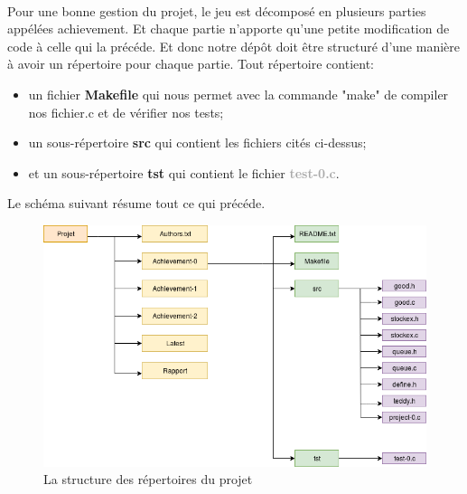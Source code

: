 \documentclass[a4paper,12pt]{article}
\begin{document}
\paragraph{}
Pour une bonne gestion du projet, le jeu est décomposé en plusieurs parties appélées achievement. Et chaque partie n'apporte qu'une petite modification de code à celle qui la précéde. Et donc notre dépôt doit être structuré d'une manière à avoir un répertoire pour chaque partie. 
Tout répertoire contient:
\newline
\begin{itemize}
\item un fichier \textbf{Makefile} qui nous permet avec la commande "make" de compiler nos fichier.c et de vérifier nos tests; 
\item un sous-répertoire \textbf{src} qui contient les fichiers cités ci-dessus; 
\item et un sous-répertoire \textbf{tst} qui contient le fichier \textcolor{darkgray}{\textbf{test-0.c}}.
\end{itemize}

Le schéma suivant résume tout ce qui précéde.
\newpage

\begin{figure}[!h]
  \centering
  \includegraphics[width=1\textwidth]{StructureRep.png}
  \caption{La structure des répertoires du projet}
  \label{fig:rep}
\end{figure}
\end{document}
